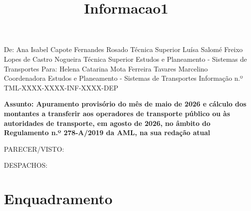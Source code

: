 \documentclass[
  a4paper,
]{article}
\title{Informacao1}
\author{}
\date{}
\begin{document}
\maketitle

De: Ana Isabel Capote Fernandes Rosado Técnica Superior Luísa Salomé
Freixo Lopes de Castro Nogueira Técnica Superior Estudos e Planeamento -
Sistemas de Transportes Para: Helena Catarina Mota Ferreira Tavares
Marcelino Coordenadora Estudos e Planeamento - Sistemas de Transportes
Informação n.º TML-XXXX-XXXX-INF-XXXX-DEP

\textbf{Assunto: Apuramento provisório do mês de maio de 2026 e cálculo
dos montantes a transferir aos operadores de transporte público ou às
autoridades de transporte, em agosto de 2026, no âmbito do Regulamento
n.º 278-A/2019 da AML, na sua redação atual}

PARECER/VISTO:

DESPACHOS:

\section{Enquadramento}\label{enquadramento}
\end{document}
